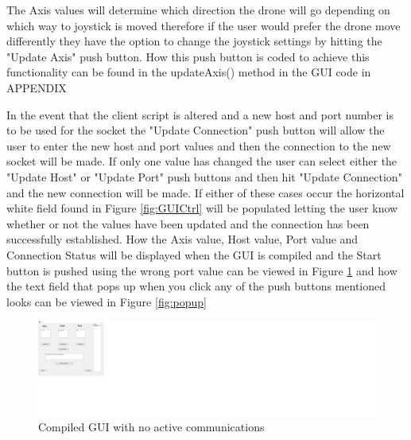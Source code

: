 The Axis values will determine which direction the drone will go depending on which way to joystick is moved therefore if the user would prefer the drone move differently they have the option to change the joystick settings by hitting the "Update Axis" push button. How this push button is coded to achieve this functionality can be found in the updateAxis() method in the GUI code in APPENDIX

In the event that the client script is altered and a new host and port number is to be used for the socket the "Update Connection" push button will allow the user to enter the new host and port values and then the connection to the new socket will be made. If only one value has changed the user can select either the "Update Host" or "Update Port" push buttons and then hit "Update Connection" and the new connection will be made. If either of these cases occur the horizontal white field found in Figure \ref{fig:GUICtrl} will be populated letting the user know whether or not the values have been updated and the connection has been successfully established. How the Axis value, Host value, Port value and Connection Status will be displayed when the GUI is compiled and the Start button is pushed using the wrong port value can be viewed in Figure \ref{fig:guipop1} and how the text field that pops up when you click any of the push buttons mentioned looks can be viewed in Figure \ref{fig:popup}

\begin{figure}[H]
	\includegraphics[width=\linewidth]{GUICtrlPop.png}
	\caption{Compiled GUI with no active communications}
	\label{fig:guipop1}
\end{figure}

